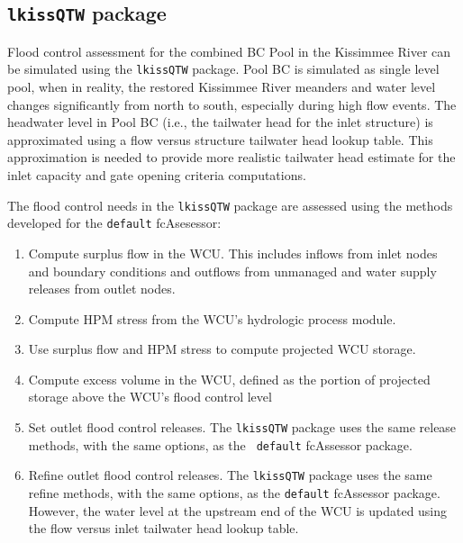 \subsection{{\tt lkissQTW} package }

Flood control assessment for the combined BC Pool in the Kissimmee
River can be simulated using the {\tt lkissQTW} package.  Pool BC is
simulated as single level pool, when in reality, the restored
Kissimmee River meanders and water level changes significantly from
north to south, especially during high flow events.  The headwater
level in Pool BC (i.e., the tailwater head for the inlet structure) is
approximated using a flow versus structure tailwater head lookup
table.  This approximation is needed to provide more realistic
tailwater head estimate for the inlet capacity and gate opening
criteria computations.

The flood control needs in the {\tt lkissQTW} package are assessed
using the methods developed for the {\tt default} fcAsesessor:

\begin{enumerate}
 \item Compute surplus flow in the WCU.  This includes inflows from
   inlet nodes and boundary conditions and outflows from unmanaged and
   water supply releases from outlet nodes.

 \item Compute HPM stress from the WCU's hydrologic process module.

 \item Use surplus flow and HPM stress to compute projected WCU
   storage.

 \item Compute excess volume in the WCU, defined as the portion of
   projected storage above the WCU's flood control level

 \item Set outlet flood control releases.  The {\tt lkissQTW} package
   uses the same release methods, with the same options, as the {\tt
   default} fcAssessor package.

 \item Refine outlet flood control releases.  The {\tt lkissQTW}
   package uses the same refine methods, with the same options, as the
   {\tt default} fcAssessor package.  However, the water level at the
   upstream end of the WCU is updated using the flow versus inlet
   tailwater head lookup table.

\end{enumerate}

